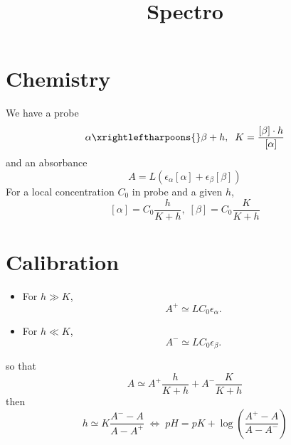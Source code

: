 \documentclass[aps]{revtex4}
\newcommand{\myconc}[1]{\left\lbrack{#1}\right\rbrack}
\begin{document}
\title{Spectro}
\maketitle

\section{Chemistry}

We have a probe
\begin{equation}
	\alpha \xrightleftharpoons{} \beta + h, \;\; K = \dfrac{\myconc{\beta}\cdot h}{ \myconc{\alpha} }
\end{equation}
and an absorbance
\begin{equation}
	A = L \left( \epsilon_\alpha \myconc{\alpha}  + \epsilon_\beta \myconc{\beta} \right)
\end{equation}
For a local concentration $C_0$ in probe and a given $h$,
\begin{equation}
	 \myconc{\alpha}  = C_0 \dfrac{h}{K+h},\; \myconc{\beta} = C_0 \dfrac{K}{K+h}
\end{equation}

\section{Calibration}
\begin{itemize}
\item For $h\gg K$, 
\begin{equation}
	A^+ \simeq L C_0 \epsilon_\alpha.
\end{equation}
\item For $h\ll K$,
\begin{equation}
		A^- \simeq L C_0 \epsilon_\beta.
\end{equation}
\end{itemize}
so that
\begin{equation}
	A \simeq A^+ \dfrac{h}{K+h} + A^- \dfrac{K}{K+h}
\end{equation}
then
\begin{equation}
	h \simeq K \dfrac{A^--A}{A-A^+} \; \Leftrightarrow \; pH = pK + \log \left( \dfrac{A^+-A}{A-A^-}\right) 
\end{equation}
\end{document}
